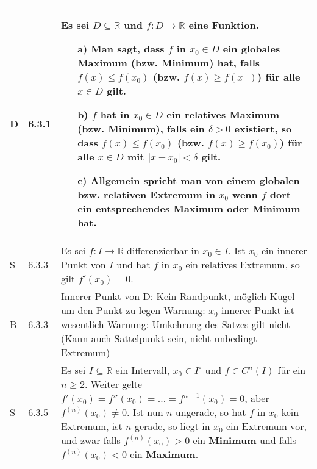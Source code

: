     \begin{longtable}{p{0.75cm} p{1cm} p{16cm}}
        \toprule

        D   & 6.3.1 &   Es sei $D \subseteq \mathbb{R}$ und $f: D \rightarrow \mathbb{R}$ eine Funktion.
                        \begin{itemize}[topsep=-0.5cm]
                            \item[a)] Man sagt, dass $f$ in $x_0 \in D$ ein \textbf{globales Maximum} (bzw. Minimum) hat, falls $f(x) \leq f(x_0)$
                                        (bzw. $f(x) \geq f(x_=)$) für alle $x \in D$ gilt.
                            \item[b)] $f$ hat in $x_0 \in D$ ein \textbf{relatives Maximum} (bzw. Minimum), falls ein $\delta > 0$ existiert, so dass $f(x) \leq f(x_0)$
                                        (bzw. $f(x) \geq f(x_0)$) für alle $x \in D$ mit $|x-x_0| < \delta$ gilt.
                            \item[c)] Allgemein spricht man von einem globalen bzw. relativen \textbf{Extremum} in $x_0$ wenn $f$ dort ein entsprechendes
                                        Maximum oder Minimum hat.
                        \end{itemize} \vspace{-0cm} \\
        \midrule
        S   & 6.3.3 &   Es sei $f: I \rightarrow \mathbb{R}$ differenzierbar in $x_0 \in I$. Ist $x_0$ ein innerer Punkt von $I$ und hat $f$ in $x_0$
                        ein relatives Extremum, so gilt $f'(x_0) = 0$. \\
        \midrule
        B   & 6.3.3 &   Innerer Punkt von D: Kein Randpunkt, möglich Kugel um den Punkt zu legen \hfill \break
                        Warnung: $x_0$ innerer Punkt ist wesentlich \hfill \break
                        Warnung: Umkehrung des Satzes gilt nicht (Kann auch Sattelpunkt sein, nicht unbedingt Extremum) \\
        \midrule
        S   & 6.3.5 &   Es sei $I \subseteq \mathbb{R}$ ein Intervall, $x_0 \in I^{\circ}$ und $f \in C^n(I)$ für ein $n \geq 2$. Weiter gelte
                        $f'(x_0) = f''(x_0) = \dots = f^{n-1}(x_0) = 0$, aber $f^{(n)}(x_0) \neq 0$. Ist nun $n$ ungerade, so hat $f$ in $x_0$ kein
                        Extremum, ist $n$ gerade, so liegt in $x_0$ ein Extremum vor, und zwar falls $f^{(n)}(x_0) > 0$ ein \textbf{Minimum} und falls
                        $f^{(n)}(x_0) < 0$ ein \textbf{Maximum}. \\
        \bottomrule

    \end{longtable}

